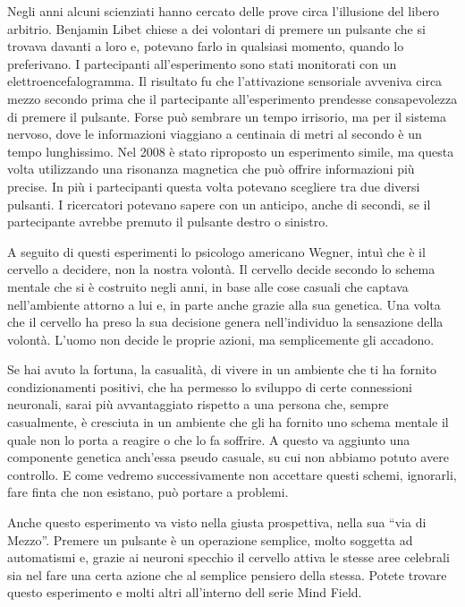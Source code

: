 \documentclass[12pt]{book} %
\begin{document}
Negli anni alcuni scienziati hanno cercato delle prove circa l'illusione del libero arbitrio.
Benjamin Libet chiese a dei volontari di premere un pulsante che si trovava davanti a loro e, potevano farlo in
qualsiasi momento, quando lo preferivano. I partecipanti all'esperimento sono stati monitorati con
un elettroencefalogramma. Il risultato fu che l'attivazione sensoriale avveniva circa mezzo
secondo prima che il partecipante all'esperimento prendesse consapevolezza di premere il pulsante.
Forse può sembrare un tempo irrisorio, ma per il sistema nervoso, dove le informazioni viaggiano a centinaia di metri
al secondo è un tempo lunghissimo. Nel 2008 è stato riproposto un esperimento simile, ma questa volta utilizzando una risonanza magnetica che può offrire informazioni più precise. In più i
partecipanti questa volta potevano scegliere tra due diversi pulsanti. I ricercatori potevano sapere con un anticipo,
anche di secondi, se il partecipante avrebbe premuto il pulsante destro o sinistro.


\bigskip

A seguito di questi esperimenti lo psicologo americano Wegner, intuì che è il cervello a decidere, non la nostra
volontà. Il cervello decide secondo lo schema mentale che si è costruito negli anni, in base alle cose casuali che
captava nell'ambiente attorno a lui e, in parte anche grazie alla sua genetica. Una volta che il
cervello ha preso la sua decisione genera nell'individuo la sensazione della volontà.
L'uomo non decide le proprie azioni, ma semplicemente gli accadono.

Se hai avuto la fortuna, la casualità, di vivere in un ambiente che ti ha fornito condizionamenti positivi, che ha
permesso lo sviluppo di certe connessioni neuronali, sarai più avvantaggiato rispetto a una persona che, sempre
casualmente, è cresciuta in un ambiente che gli ha fornito uno schema mentale il quale non lo porta a reagire o che lo
fa soffrire. A questo va aggiunto una componente genetica anch'essa pseudo casuale, su cui non
abbiamo potuto avere controllo. E come vedremo successivamente non accettare questi schemi, ignorarli, fare finta che
non esistano, può portare a problemi.

Anche questo esperimento va visto nella giusta prospettiva, nella sua “via di Mezzo”. Premere un pulsante è un
operazione semplice, molto soggetta ad automatismi e, grazie ai neuroni specchio il cervello attiva le stesse aree
celebrali sia nel fare una certa azione che al semplice pensiero della stessa. Potete trovare questo esperimento e
molti altri all'interno dell serie Mind
Field.
\end{document}
